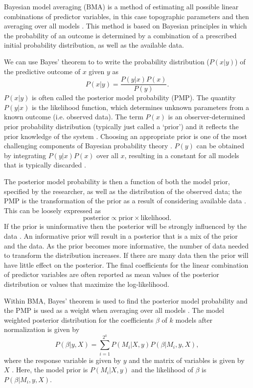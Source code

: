 \documentclass{sfuthesis}
\begin{document}
{Bayesian model averaging (BMA) is a method of estimating all possible linear combinations of predictor variables, in this case topographic parameters and then averaging over all models \citep[e.g.][]{Raftery1997, Wasserman2000, Raftery2005}.  This method is based on Bayesian principles in which the probability of an outcome is determined by a combination of a prescribed initial probability distribution, as well as the available data. 

We can use Bayes' theorem to to write the probability distribution ($P(x|y)$) of the predictive outcome of $x$ given $y$ as
\begin{equation}
P(x|y) = \frac{P(y|x)P(x)}{P(y)}.
\end{equation}
$P(x|y)$ is often called the posterior model probability (PMP). The quantity $P(y|x)$ is the likelihood function, which determines unknown parameters from a known outcome (i.e. observed data). The term $P(x)$ is an observer-determined prior probability distribution (typically just called a `prior') and it reflects the prior knowledge of the system \citep{Raftery1997}. Choosing an appropriate prior is one of the most challenging components of Bayesian probability theory \citep{Wasserman2000}. $P(y)$ can be obtained by integrating $P(y|x)P(x)$ over all $x$, resulting in a constant for all models that is typically discarded \citep{Wasserman2000}. 

The posterior model probability is then a function of both the model prior, specified by the researcher, as well as the distribution of the observed data; the PMP is the transformation of the prior as a result of considering available data \citep{Wasserman2000}. This can be loosely expressed as
\begin{equation}
\textrm{posterior} \propto \textrm{prior} \times \textrm{likelihood}.
\end{equation}
If the prior is uninformative then the posterior will be strongly influenced by the data \citep{Wasserman2000}. An informative prior will result in a posterior that is a mix of the prior and the data. As the prior becomes more informative, the number of data needed to transform the distribution increases. If there are many data then the prior will have little effect on the posterior. The final coefficients for the linear combination of predictor variables are often reported as mean values of the posterior distribution or values that maximize the log-likelihood. 

Within BMA, Bayes' theorem is used to find the posterior model probability and the PMP is used as a weight when averaging over all models \citep{Wasserman2000}. The model weighted posterior distribution for the coefficients $\beta$ of $k$ models after normalization is given by 
\begin{equation}
P(\beta| y,X) = \sum\limits_{i=1}^{2^k} P(M_i | X,y)P(\beta | M_i , y, X),
\end{equation}
where the response variable is given by $y$ and the matrix of variables is given by $X$ \citep{Raftery1997}. Here, the model prior is $P(M_i | X,y)$ and the likelihood of $\beta$ is $P(\beta | M_i , y, X)$.

}
\end{document}
